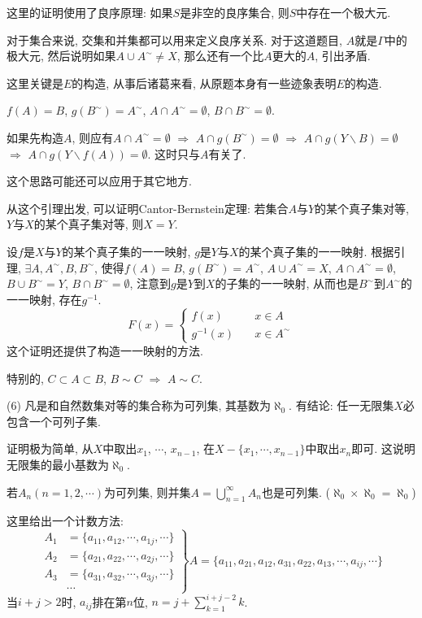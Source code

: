 \documentclass[12pt,a4paper,openany]{book}
\begin{document}
这里的证明使用了良序原理: 如果$S$是非空的良序集合, 则$S$中存在一个极大元.

对于集合来说, 交集和并集都可以用来定义良序关系. 对于这道题目, $A$就是$\Gamma$中的极大元, 然后说明如果$A \cup A^{\sim} \neq X$, 那么还有一个比$A$更大的$A$, 引出矛盾.

这里关键是$E$的构造, 从事后诸葛来看, 从原题本身有一些迹象表明$E$的构造.

$f(A) = B$, $g(B^{\sim}) = A^{\sim}$, $A \cap A^{\sim} = \emptyset$, $B \cap B^{\sim} = \emptyset$.

如果先构造$A$, 则应有$A \cap A^{\sim} = \emptyset$ $\Rightarrow$ $A \cap g(B^{\sim}) = \emptyset$ $\Rightarrow$ $A \cap g(Y \backslash B) = \emptyset$ $\Rightarrow$ $A \cap g(Y \backslash f(A)) = \emptyset$. 这时只与$A$有关了.

这个思路可能还可以应用于其它地方.

从这个引理出发, 可以证明Cantor-Bernstein定理: 若集合$A$与$Y$的某个真子集对等, $Y$与$X$的某个真子集对等, 则$X = Y$.

设$f$是$X$与$Y$的某个真子集的一一映射, $g$是$Y$与$X$的某个真子集的一一映射. 根据引理, $\exists A, A^{\sim}, B, B^{\sim}$, 使得$f(A) = B$, $g(B^{\sim}) = A^{\sim}$, $A \cup A^{\sim} = X$, $A \cap A^{\sim} = \emptyset$, $B \cup B^{\sim} = Y$, $B \cap B^{\sim} = \emptyset$, 注意到$g$是$Y$到$X$的子集的一一映射, 从而也是$B^{\sim}$到$A^{\sim}$的一一映射, 存在$g^{-1}$.
$$
F(x) = \left\{
\begin{aligned}
f(x) &\quad x \in A \\
g^{-1}(x) &\quad x \in A^{\sim}
\end{aligned}
\right.
$$
这个证明还提供了构造一一映射的方法.

特别的, $C \subset A \subset B$, $B \sim C$ $\Rightarrow$ $A \sim C$.

(6) 凡是和自然数集对等的集合称为可列集, 其基数为$\aleph_0$. 有结论: 任一无限集$X$必包含一个可列子集.

证明极为简单, 从$X$中取出$x_1$, $\cdots$, $x_{n-1}$, 在$X - \{x_1, \cdots, x_{n-1}\}$中取出$x_n$即可. 这说明无限集的最小基数为$\aleph_0$.

若$A_n(n=1, 2, \cdots)$为可列集, 则并集$A = \bigcup\limits_{n=1}^{\infty}{A_n}$也是可列集. ($\aleph_0 \times \aleph_0 = \aleph_0$)

这里给出一个计数方法:
$$
\left.
\begin{aligned}
A_1 &= \{a_{11}, a_{12}, \cdots, a_{1j}, \cdots \} \\
A_2 &= \{a_{21}, a_{22}, \cdots, a_{2j}, \cdots \} \\
A_3 &= \{a_{31}, a_{32}, \cdots, a_{3j}, \cdots \} \\
&\cdots
\end{aligned}
\right\}
A = \{a_{11}, a_{21}, a_{12}, a_{31}, a_{22}, a_{13}, \cdots, a_{ij}, \cdots\}
$$
当$i + j > 2$时, $a_{ij}$排在第$n$位, $n = j + \sum\limits_{k=1}^{i+j-2}{k}$.
\end{document}
